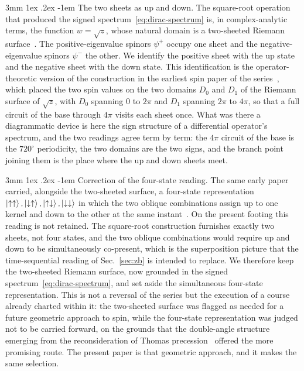 \documentclass[%
 reprint, amsmath,amssymb, aps, prb, ]{revtex4-2}
\makeatletter
\numberwithin{equation}{section}
\renewcommand\paragraph{%
  \@startsection{paragraph}{4}{\z@}%
    {3mm \@plus 1ex \@minus .2ex}%
    {-1em}%
    {\normalfont\normalsize\itshape}}
\makeatother
\begin{document}
\paragraph{The two sheets as up and down.}
The square-root operation that produced the signed spectrum~\eqref{eq:dirac-spectrum} is, in complex-analytic terms, the function $w=\sqrt{z}$, whose natural domain is a two-sheeted Riemann surface~\cite{Hitchin1974}. The positive-eigenvalue spinors $\psi^{+}$ occupy one sheet and the negative-eigenvalue spinors $\psi^{-}$ the other. We identify the positive sheet with the up state and the negative sheet with the down state. This identification is the operator-theoretic version of the construction in the earliest spin paper of the series~\cite{hanamura03}, which placed the two spin values on the two domains $D_{0}$ and $D_{1}$ of the Riemann surface of $\sqrt{z}$, with $D_{0}$ spanning $0$ to $2\pi$ and $D_{1}$ spanning $2\pi$ to $4\pi$, so that a full circuit of the base through $4\pi$ visits each sheet once. What was there a diagrammatic device is here the sign structure of a differential operator's spectrum, and the two readings agree term by term: the $4\pi$ circuit of the base is the $720^{\circ}$ periodicity, the two domains are the two signs, and the branch point joining them is the place where the up and down sheets meet.

\paragraph{Correction of the four-state reading.}
The same early paper carried, alongside the two-sheeted surface, a four-state representation $\ket{\uparrow\uparrow},\ket{\downarrow\uparrow},\ket{\uparrow\downarrow},\ket{\downarrow\downarrow}$ in which the two oblique combinations assign up to one kernel and down to the other at the same instant~\cite{hanamura03}. On the present footing this reading is not retained. The square-root construction furnishes exactly two sheets, not four states, and the two oblique combinations would require up and down to be simultaneously co-present, which is the superposition picture that the time-sequential reading of Sec.~\ref{sec:zb} is intended to replace. We therefore keep the two-sheeted Riemann surface, now grounded in the signed spectrum~\eqref{eq:dirac-spectrum}, and set aside the simultaneous four-state representation. This is not a reversal of the series but the execution of a course already charted within it: the two-sheeted surface was flagged as needed for a future geometric approach to spin, while the four-state representation was judged not to be carried forward, on the grounds that the double-angle structure emerging from the reconsideration of Thomas precession~\cite{hanamura50} offered the more promising route. The present paper is that geometric approach, and it makes the same selection.
\end{document}
